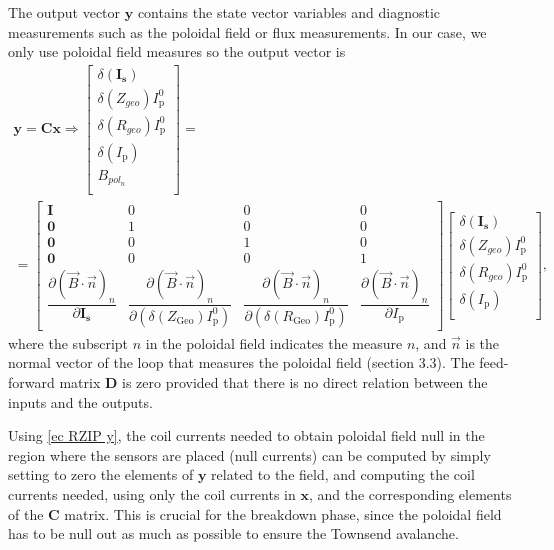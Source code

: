 \documentclass[a4paper,12pt,oneside]{book}
\newcommand{\p}{\partial}
\begin{document}
The output vector $\boldsymbol{y}$ contains the state vector variables and diagnostic measurements such as the poloidal field or flux measurements. In our case, we only use poloidal field measures so the output vector is
%
\begin{equation}\label{ec RZIP y}
	\left.
	\begin{array}{c}
		\boldsymbol{y}=\boldsymbol{C} \boldsymbol{x} \Rightarrow
		\left[
		\begin{array}{c}
		\delta(\boldsymbol{I_\text{s}}) \\
		\delta(Z_{geo}) I_\text{p}^0 \\
		\delta(R_{geo}) I_\text{p}^0 \\
		\delta(I_\text{p}) \\
		B_{pol_n} \\
		\end{array}
		\right]
		=
		\\
		=
		\left[
		\begin{array}{cccc}
		\boldsymbol{I} & 0 & 0 & 0\\
		\boldsymbol{0} & 1 & 0 & 0\\
		\boldsymbol{0} & 0 & 1 & 0\\	
		\boldsymbol{0} & 0 & 0 & 1\\	
		\dfrac{\p (\vec{B} \cdot \vec{n})_n}{\p \boldsymbol{I_				\text{s}}} & \dfrac{\p (\vec{B} \cdot \vec{n})_n}{\p (\delta(Z_\text{Geo})I_\text{p}^0)} & \dfrac{\p (\vec{B} \cdot \vec{n})_n}{\p (\delta(R_\text{Geo})I_\text{p}^0)} & \dfrac{\p (\vec{B} \cdot \vec{n})_n}{\p I_\text{p}}
		\end{array}
		\right]
		\left[
		\begin{array}{c}
		\delta(\boldsymbol{I_\text{s}}) \\
		\delta(Z_{geo}) I_\text{p}^0 \\
		\delta(R_{geo}) I_\text{p}^0 \\
		\delta(I_\text{p}) \\
		\end{array}\right],
	\end{array} \right.
\end{equation}
where the subscript $n$ in the poloidal field indicates the measure $n$, and $\vec{n}$ is the normal vector of the loop that measures the poloidal field \cite{AtiSharmaTesis} (section 3.3). The feed-forward matrix $\boldsymbol{D}$ is zero provided that there is no direct relation between the inputs and the outputs. 

Using \eqref{ec RZIP y}, the coil currents needed to obtain poloidal field null in the region where the sensors are placed (null currents) can be computed by simply setting to zero the elements of $\boldsymbol{y}$ related to the field, and computing the coil currents needed, using only the coil currents in $\boldsymbol{x}$, and the corresponding elements of the $\boldsymbol{C}$ matrix.  This is crucial for the breakdown phase, since the poloidal field has to be null out as much as possible to ensure the Townsend avalanche.
\end{document}
